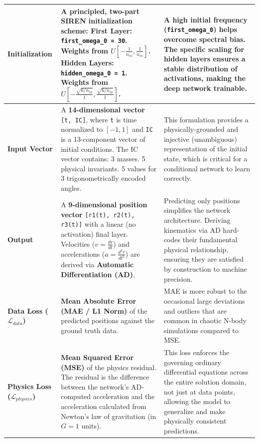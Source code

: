 \begin{small}
\begin{longtable}{|>{\raggedright\arraybackslash}p{}|>{\raggedright\arraybackslash}p{}|>{\raggedright\arraybackslash}p{}|}
\textbf{Initialization} & A principled, two-part SIREN initialization scheme: \newline \textbullet{} \textbf{First Layer:} \texttt{first\_omega\_0 = 30}. Weights from $U[-\frac{1}{n_{in}}, \frac{1}{n_{in}}]$. \newline \textbullet{} \textbf{Hidden Layers:} \texttt{hidden\_omega\_0 = 1}. Weights from $U[-\frac{\sqrt{6/n_{in}}}{1}, \frac{\sqrt{6/n_{in}}}{1}]$. & A high initial frequency (\texttt{first\_omega\_0}) helps overcome spectral bias. The specific scaling for hidden layers ensures a stable distribution of activations, making the deep network trainable. \\
\hline
\textbf{Input Vector} & A \textbf{14-dimensional vector} \texttt{[t, IC]}, where \texttt{t} is time normalized to $[-1,1]$ and \texttt{IC} is a 13-component vector of initial conditions. The IC vector contains: \newline \textbullet{} 3 masses. \newline \textbullet{} 5 physical invariants. \newline \textbullet{} 5 values for 3 trigonometrically encoded angles. & This formulation provides a physically-grounded and injective (unambiguous) representation of the initial state, which is critical for a conditional network to learn correctly. \\
\hline
\textbf{Output} & A \textbf{9-dimensional position vector} \texttt{[r1(t), r2(t), r3(t)]} with a linear (no activation) final layer. Velocities ($v=\frac{dr}{dt}$) and accelerations ($a=\frac{d^{2}r}{dt^{2}}$) are derived via \textbf{Automatic Differentiation (AD)}. & Predicting only positions simplifies the network architecture. Deriving kinematics via AD hard-codes their fundamental physical relationship, ensuring they are satisfied by construction to machine precision. \\
\hline
\textbf{Data Loss ($\mathcal{L}_{data}$)} & \textbf{Mean Absolute Error (MAE / L1 Norm)} of the predicted positions against the ground truth data. & MAE is more robust to the occasional large deviations and outliers that are common in chaotic N-body simulations compared to MSE. \\
\hline
\textbf{Physics Loss ($\mathcal{L}_{physics}$)} & \textbf{Mean Squared Error (MSE)} of the physics residual. The residual is the difference between the network's AD-computed acceleration and the acceleration calculated from Newton's law of gravitation (in $G=1$ units). & This loss enforces the governing ordinary differential equations across the entire solution domain, not just at data points, allowing the model to generalize and make physically consistent predictions. \\

\end{longtable}
\end{small}
